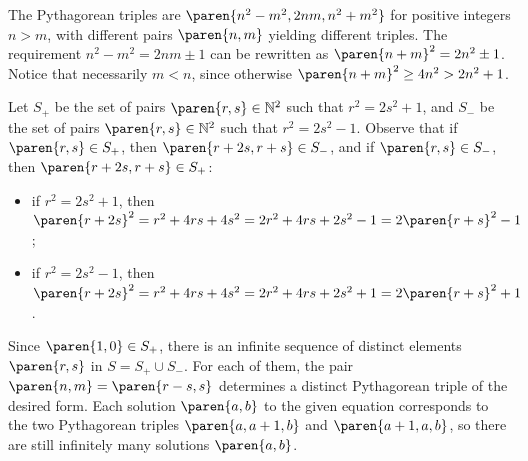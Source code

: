 The Pythagorean triples are $\paren{n^2 - m^2, 2 n m, n^2 + m^2}$ for positive integers $n > m$,
with different pairs $\paren{n, m}$ yielding different triples.
The requirement $n^2 - m^2 = 2 n m \pm 1$ can be rewritten as $\paren{n + m}^2 = 2 n^2 \pm 1$.
Notice that necessarily $m < n$, since otherwise $\paren{n + m}^2 \geq 4 n^2 > 2 n^2 + 1$.

Let $S_{+}$ be the set of pairs $\paren{r, s} \in \mathbb{N}^2$ such that $r^2 = 2 s^2 + 1$,
and $S_{-}$ be the set of pairs $\paren{r, s} \in \mathbb{N}^2$ such that $r^2 = 2 s^2 - 1$.
Observe that if $\paren{r, s} \in S_{+}$, then $\paren{r + 2 s, r + s} \in S_{-}$,
and if $\paren{r, s} \in S_{-}$, then $\paren{r + 2 s, r + s} \in S_{+}$:
\begin{itemize}
  \item[--] if $r^2 = 2 s^2 + 1$, then $\paren{r + 2 s}^2 = r^2 + 4 r s + 4 s^2 = 2 r^2 + 4 r s + 2 s^2 - 1 = 2 \paren{r + s}^2 - 1$;
  \item[--] if $r^2 = 2 s^2 - 1$, then $\paren{r + 2 s}^2 = r^2 + 4 r s + 4 s^2 = 2 r^2 + 4 r s + 2 s^2 + 1 = 2 \paren{r + s}^2 + 1$.
\end{itemize}
Since $\paren{1, 0} \in S_{+}$, there is an infinite sequence of distinct elements $\paren{r, s}$ in $S = S_{+} \cup S_{-}$.
For each of them, the pair $\paren{n, m} = \paren{r - s, s}$ determines a distinct Pythagorean triple of the desired form.
Each solution $\paren{a, b}$ to the given equation corresponds to the two Pythagorean triples $\paren{a, a + 1, b}$ and $\paren{a + 1, a, b}$,
so there are still infinitely many solutions $\paren{a, b}$.
